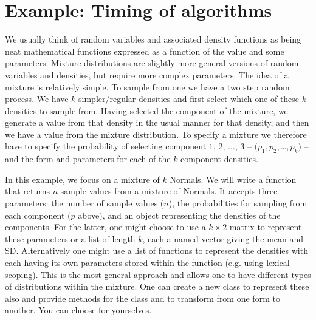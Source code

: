 
\section{Example: Timing of algorithms} 
We usually think of random variables and
  associated density functions as being neat mathematical functions
  expressed as a function of the value and some parameters.  Mixture
  distributions are slightly more general versions of random variables
  and densities, but require more complex parameters.  The idea of a
  mixture is relatively simple.  To sample from one we have a two step
  random process.  We have $k$ simpler/regular densities and first
  select which one of these $k$ densities to sample from.  Having
  selected the component of the mixture, we generate a value from that
  density in the usual manner for that density, and then we have a
  value from the mixture distribution.  To specify a mixture we
  therefore have to specify the probability of selecting component
  $1$, $2$, $\ldots$, $3$ -- $(p_1, p_2, $\ldots$, p_k)$ -- and the
  form and parameters for each of the $k$ component densities.

  In this example, we focus on a mixture of $k$ Normals.  We will 
  write a function that returns $n$ sample values from a
  mixture of Normals.  It accepts three parameters: the number
  of sample values ($n$), the probabilities for sampling from each
  component ($p$ above), and an object representing the densities of
  the components.  For the latter, one might choose to use a $k \times
  2$ matrix to represent these parameters or a list of length $k$, each
  a named vector giving the mean and SD.  Alternatively one might use
  a list of functions to represent the densities with each having its
  own parameters stored within the function (e.g. using lexical
  scoping). This is the most general approach and allows one to have
  different types of distributions within the mixture.  One can create
  a new class to represent these also and provide methods for the
  class and to transform from one form to another.  You can choose for
  yourselves.

 
